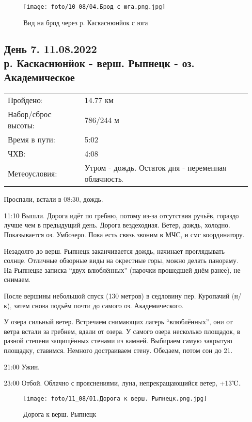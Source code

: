 \begin{figure}[H]
    \centering
    \texttt{[image: foto/10\_08/04.Брод с юга.png.jpg]}
    \caption{Вид на брод через р. Каскаснюнйок с юга}
\end{figure}

\subsection{День 7. 11.08.2022\\
 р. Каскаснюнйок - верш. Рыпнецк - оз. Академическое}
\begin{tabular}{l p{12cm}}
\hline
Пройдено: & 14.77 км\\
Набор/сброс высоты: & 786/244 м\\
Время в пути: & 5:02\\
ЧХВ: & 4:08\\
Метеоусловия: & Утром - дождь. Остаток дня - переменная облачность.\\
\hline
\end{tabular}

Проспали, встали в 08:30, дождь.

11:10 Вышли.
Дорога идёт по гребню, потому из-за отсутствия ручьёв, гораздо лучше чем в предыдущий день.
Дорога вездеходная. Ветер, дождь, холодно. Показывается оз. Умбозеро. Пока есть связь звоним в МЧС, и смс координатору.

Незадолго до верш. Рыпнецк заканчивается дождь, начинает проглядывать солнце. Отличные обзорные виды на окрестные горы,
можно делать панораму. На Рыпнецке записка ``двух влюблённых'' (парочки прошедшей днём ранее), не снимаем.

После вершины небольшой спуск (130 метров) в седловину пер. Куропачий (н/к), затем снова подъём почти
до самого оз. Академического.

У озера сильный ветер. Встречаем снимающих лагерь ``влюблённых'', они от ветра  встали за гребнем, вдали от озера.
У самого озера несколько площадок, в разной степени защищённых стенами из камней.
Выбираем самую закрытую площадку, ставимся. Немного достраиваем стену. Обедаем, потом сон до 21.

21:00 Ужин.

23:00 Отбой. Облачно с прояснениями, луна, непрекращающийся ветер, +13$\tccentigrade$.

\begin{figure}
    \centering
    \texttt{[image: foto/11\_08/01.Дорога к верш. Рыпнецк.png.jpg]}
    \caption{Дорога к верш. Рыпнецк}
\end{figure}

